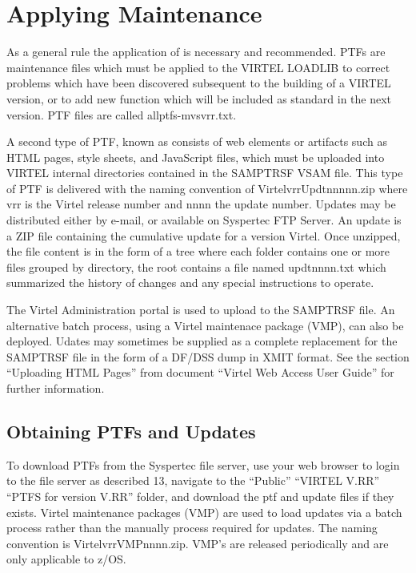 \documentclass[letterpaper,10pt,english]{sphinxmanual}
\begin{document}
\newpage


\section{Applying Maintenance}
\label{\detokenize{Installation_Guide:index-5}}\label{\detokenize{Installation_Guide:applying-maintenance}}
As a general rule the application of  is necessary and recommended. PTFs are maintenance files which must be applied to the VIRTEL LOADLIB to correct problems which have been discovered subsequent to the building of a VIRTEL version, or to add new function which will be included as standard in the next version. PTF files are called allptfs-mvsvrr.txt.

A second type of PTF, known as  consists of web elements or artifacts such as HTML pages, style sheets, and JavaScript files, which must be uploaded into VIRTEL internal directories contained in the SAMPTRSF VSAM file. This type of PTF is delivered with the naming convention of VirtelvrrUpdtnnnnn.zip where vrr is the Virtel release number and nnnn the update number. Updates may be distributed either by e-mail, or available on Syspertec FTP Server. An update is a ZIP file containing the cumulative update for a version Virtel. Once unzipped, the file content is in the form of a tree where each folder contains one or more files grouped by directory, the root contains a file named updtnnnn.txt which summarized the history of changes and any special instructions to operate.

The Virtel Administration portal is used to upload  to the SAMPTRSF file. An alternative batch process, using a Virtel maintenace package (VMP), can also be deployed. Udates may sometimes be supplied as a complete replacement for the SAMPTRSF file in the form of a DF/DSS dump in XMIT format. See the section “Uploading HTML Pages” from document “Virtel Web Access User Guide” for further information.


\subsection{Obtaining PTFs and Updates}
\label{\detokenize{Installation_Guide:obtaining-ptfs-and-updates}}
To download PTFs from the Syspertec file server, use your web browser to login to the file server as described 13, navigate to the “Public” \textendash{} “VIRTEL V.RR” \textendash{} “PTFS for version V.RR” folder, and download the ptf and update files if they exists. Virtel maintenance packages (VMP) are used to load updates via a batch process rather than the manually process required for updates. The naming convention is VirtelvrrVMPnnnn.zip. VMP’s are released periodically and are only applicable to z/OS.
\end{document}
